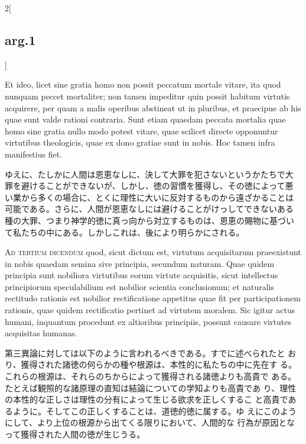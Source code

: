 \documentclass[paper=a4paper,fontsize=10pt,jafontsize=9pt,titlepage]{jlreq}
\begin{document}
\begin{paracol}{2}[\subsection{arg.1}]
\switchcolumn*

Et ideo, licet sine gratia homo non possit peccatum mortale vitare,
 ita quod nunquam peccet mortaliter; non tamen impeditur quin possit
 habitum virtutis acquirere, per quam a malis operibus abstineat ut in
 pluribus, et praecipue ab his quae sunt valde rationi contraria. Sunt
 etiam quaedam peccata mortalia quae homo sine gratia nullo modo
 potest vitare, quae scilicet directe opponuntur virtutibus
 theologicis, quae ex dono gratiae sunt in nobis. Hoc tamen infra
 manifestius fiet.

\switchcolumn

ゆえに、たしかに人間は恩恵なしに、決して大罪を犯さないというかたちで大
罪を避けることができないが、しかし、徳の習慣を獲得し、その徳によって悪
い業から多くの場合に、とくに理性に大いに反対するものから遠ざかることは
可能である。さらに、人間が恩恵なしには避けることがけっしてできないある
種の大罪、つまり神学的徳に真っ向から対立するものは、恩恵の賜物に基づい
て私たちの中にある。しかしこれは、後により明らかにされる。

\switchcolumn*[\subsection{ad.3}]

{\scshape Ad tertium dicendum} quod, sicut dictum est, virtutum
acquisitarum praeexistunt in nobis quaedam semina sive principia,
secundum naturam. Quae quidem principia sunt nobiliora virtutibus
eorum virtute acquisitis, sicut intellectus principiorum speculabilium
est nobilior scientia conclusionum; et naturalis rectitudo rationis
est nobilior rectificatione appetitus quae fit per participationem
rationis, quae quidem rectificatio pertinet ad virtutem moralem. Sic
igitur actus humani, inquantum procedunt ex altioribus principiis,
possunt causare virtutes acquisitas humanas.

\switchcolumn

第三異論に対しては以下のように言われるべきである。すでに述べられたと
 おり、獲得された諸徳の何らかの種や根源は、本性的に私たちの中に先在す
 る。これらの根源は、それらのちからによって獲得される諸徳よりも高貴で
 ある。たとえば観照的な諸原理の直知は結論についての学知よりも高貴であ
 り、理性の本性的な正しさは理性の分有によって生じる欲求を正しくするこ
 と高貴であるように。そしてこの正しくすることは、道徳的徳に属する。ゆ
 えにこのようにして、より上位の根源から出てくる限りにおいて、人間的な
 行為が原因となって獲得された人間の徳が生じうる。

\end{paracol}
\newpage
{}
{}
\setcounter{section}{3}
\setcounter{subsection}{0}
\end{document}
